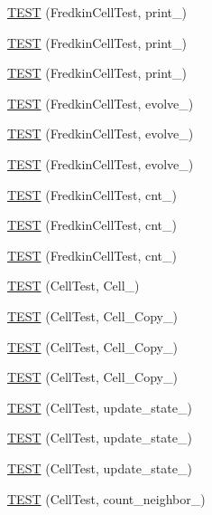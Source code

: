 \begin{DoxyCompactItemize}
\item 
\hyperlink{TestLife_8c_09_09_ae29136adf14a356e667aba4ca2be4751}{T\-E\-S\-T} (Fredkin\-Cell\-Test, print\-\_)
\item 
\hyperlink{TestLife_8c_09_09_a119a1bcf5d3ae8b281ab77af7148e7e6}{T\-E\-S\-T} (Fredkin\-Cell\-Test, print\-\_)
\item 
\hyperlink{TestLife_8c_09_09_a87e4871d5cd2d6e779c4b451b14053b0}{T\-E\-S\-T} (Fredkin\-Cell\-Test, print\-\_)
\item 
\hyperlink{TestLife_8c_09_09_a0a495946bd2f5416b83a2733a071e8ae}{T\-E\-S\-T} (Fredkin\-Cell\-Test, evolve\-\_)
\item 
\hyperlink{TestLife_8c_09_09_a99dca9e7068afd2e7c91cf143a60bc83}{T\-E\-S\-T} (Fredkin\-Cell\-Test, evolve\-\_)
\item 
\hyperlink{TestLife_8c_09_09_a7f275a6cca40fec5cc2a8a73e3b58bd0}{T\-E\-S\-T} (Fredkin\-Cell\-Test, evolve\-\_)
\item 
\hyperlink{TestLife_8c_09_09_ade56e9f246ee1decd27eb30de10f94cd}{T\-E\-S\-T} (Fredkin\-Cell\-Test, cnt\-\_)
\item 
\hyperlink{TestLife_8c_09_09_a1c33961832230cd6b5fd4ae867459d4f}{T\-E\-S\-T} (Fredkin\-Cell\-Test, cnt\-\_)
\item 
\hyperlink{TestLife_8c_09_09_a13fdc5b7ad23fe5dfe60f24fc9091b9d}{T\-E\-S\-T} (Fredkin\-Cell\-Test, cnt\-\_)
\item 
\hyperlink{TestLife_8c_09_09_a73b56236746d479910d7dd67f58e8154}{T\-E\-S\-T} (Cell\-Test, Cell\-\_)
\item 
\hyperlink{TestLife_8c_09_09_ad2e24c4b810970d6c22311c658c8b225}{T\-E\-S\-T} (Cell\-Test, Cell\-\_\-\-Copy\-\_)
\item 
\hyperlink{TestLife_8c_09_09_af836eafd0bbdca781c76dc9a403ae22b}{T\-E\-S\-T} (Cell\-Test, Cell\-\_\-\-Copy\-\_)
\item 
\hyperlink{TestLife_8c_09_09_a82ed6a1a0ec538acbd4a711ccabe841a}{T\-E\-S\-T} (Cell\-Test, Cell\-\_\-\-Copy\-\_)
\item 
\hyperlink{TestLife_8c_09_09_a0e7b3e70ab430857e62d754d1845557f}{T\-E\-S\-T} (Cell\-Test, update\-\_\-state\-\_)
\item 
\hyperlink{TestLife_8c_09_09_a71dc6092e61bf16cc3a88b54d8598d69}{T\-E\-S\-T} (Cell\-Test, update\-\_\-state\-\_)
\item 
\hyperlink{TestLife_8c_09_09_a5f7ec5fb158b2cb18bbd8870c9c0cff2}{T\-E\-S\-T} (Cell\-Test, update\-\_\-state\-\_)
\item 
\hyperlink{TestLife_8c_09_09_afbbb557207aedc58018ed8ddb2ba12c6}{T\-E\-S\-T} (Cell\-Test, count\-\_\-neighbor\-\_)

\end{DoxyCompactItemize}
